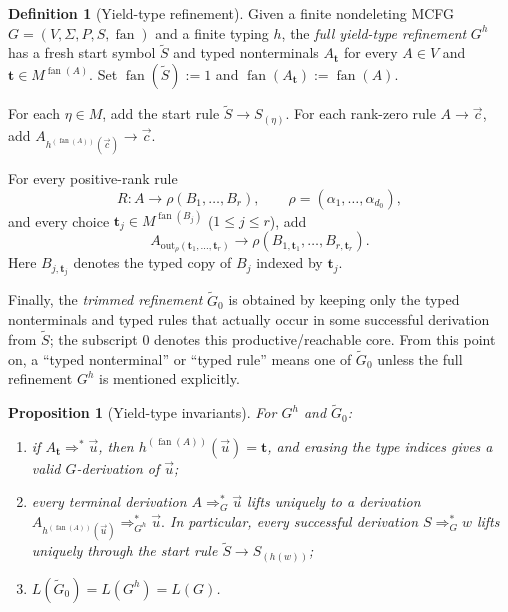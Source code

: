 \documentclass[11pt]{article}
\numberwithin{equation}{section}
\theoremstyle{plain}
\newtheorem{proposition}[theorem]{Proposition}
\theoremstyle{definition}
\newtheorem{definition}[theorem]{Definition}
\theoremstyle{remark}
\newcommand{\out}{\mathrm{out}}
\newcommand{\tuple}[1]{\vec{#1}}
\newcommand{\fan}{\operatorname{fan}}
\begin{document}
\begin{definition}[Yield-type refinement]
\label{def:output-refinement}
Given a finite nondeleting MCFG \(G=(V,\Sigma,P,S,\fan)\) and a finite
typing \(h\), the \emph{full yield-type refinement} \(G^h\) has a fresh
start symbol \(\widetilde S\) and typed nonterminals
\(A_{\mathbf t}\) for every \(A\in V\) and
\(\mathbf t\in M^{\fan(A)}\).
Set
\(\fan(\widetilde S):=1\) and
\(\fan(A_{\mathbf t}):=\fan(A)\).

For each \(\eta\in M\), add the start rule
\(\widetilde S\to S_{(\eta)}\).
For each rank-zero rule \(A\to\tuple c\), add
\(A_{h^{(\fan(A))}(\tuple c)}\to\tuple c\).

For every positive-rank rule
\[
R:A\to\rho(B_1,\ldots,B_r),
\qquad
\rho=(\alpha_1,\ldots,\alpha_{d_0}),
\]
and every choice $\mathbf t_j\in M^{\fan(B_j)}$ ($1\le j\le r$), add
\[
  A_{\out_\rho(\mathbf t_1,\ldots,\mathbf t_r)}
  \to
  \rho(B_{1,\mathbf t_1},\ldots,B_{r,\mathbf t_r}).
\]
Here \(B_{j,\mathbf t_j}\) denotes the typed copy of \(B_j\) indexed by
\(\mathbf t_j\).

Finally, the \emph{trimmed refinement} \(\widetilde G_0\) is obtained by
keeping only the typed nonterminals and typed rules that actually occur in some
successful derivation from \(\widetilde S\); the subscript $0$ denotes this
productive/reachable core.  From this point on, a ``typed nonterminal'' or
``typed rule'' means one of \(\widetilde G_0\) unless the full refinement
\(G^h\) is mentioned explicitly.
\end{definition}

\begin{proposition}[Yield-type invariants]
\label{prop:output-invariants}
For \(G^h\) and \(\widetilde G_0\):
\begin{enumerate}[label=(\roman*),leftmargin=*]
\item if \(A_{\mathbf t}\Rightarrow^*\tuple u\), then
\(h^{(\fan(A))}(\tuple u)=\mathbf t\), and erasing the type indices gives a
valid \(G\)-derivation of \(\tuple u\);
\item every terminal derivation
\(A\Rightarrow_G^*\tuple u\)
lifts uniquely to a derivation
\(A_{h^{(\fan(A))}(\tuple u)}\Rightarrow_{G^h}^*\tuple u.\)
In particular, every successful derivation \(S\Rightarrow_G^* w\) lifts
uniquely through the start rule
\(
  \widetilde S\to S_{(h(w))}
\);
\item \(L(\widetilde G_0)=L(G^h)=L(G)\).
\end{enumerate}
\end{proposition}
\end{document}
